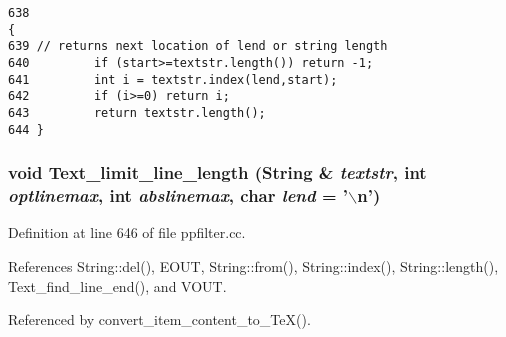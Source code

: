 \footnotesize\begin{verbatim}638                                                                       {
639 // returns next location of lend or string length
640         if (start>=textstr.length()) return -1;
641         int i = textstr.index(lend,start);
642         if (i>=0) return i;
643         return textstr.length();
644 }
\end{verbatim}\normalsize 
{}
\subsubsection{\setlength{\rightskip}{0pt plus 5cm}void Text\_\-limit\_\-line\_\-length ({\bf String} \& {\em textstr}, int {\em optlinemax}, int {\em abslinemax}, char {\em lend} = '$\backslash$n')}\label{ppfilter_8cc_a16}




Definition at line 646 of file ppfilter.cc.

References String::del(), EOUT, String::from(), String::index(), String::length(), Text\_\-find\_\-line\_\-end(), and VOUT.

Referenced by convert\_\-item\_\-content\_\-to\_\-Te\-X().



